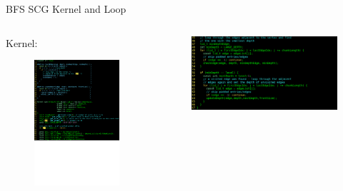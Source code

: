 \documentclass{beamer}
\begin{document}
\begin{frame}{BFS SCG Kernel and Loop}
  \begin{columns}
    \begin{column}{0.5\textwidth}
      Kernel:
      \begin{figure}
        \centering
        \includegraphics[width=\textwidth]{figures/bfsScgKernelp1.png}
      \end{figure}  
    \end{column}
    \begin{column}{0.5\textwidth}
      \begin{figure}
        \vspace*{-2cm}
        \centering
        \includegraphics[width=\textwidth]{figures/bfsScgKernelp2.png}

\end{figure}
\end{column}
\end{columns}
\end{frame}
\end{document}
